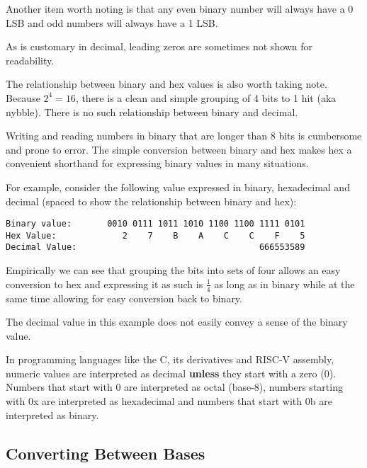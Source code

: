 Another item worth noting is that any even binary number will always
have a 0 LSB and odd numbers will always have a 1 LSB.

As is customary in decimal, leading zeros are sometimes not shown 
for readability.

The relationship between binary and hex values is also worth taking
note.  Because $2^4 = 16$, there is a clean and simple grouping
of 4 \gls{bit}s to 1 \gls{hit} (aka \gls{nybble}).  
There is no such relationship between binary and decimal.  

Writing and reading numbers in binary that are longer than 8 bits 
is cumbersome and prone to error.  The simple conversion between 
binary and hex makes hex a convenient shorthand for expressing 
binary values in many situations.  

For example, consider the following value expressed in binary, 
hexadecimal and decimal (spaced to show the relationship
between binary and hex):

\begin{verbatim}
Binary value:       0010 0111 1011 1010 1100 1100 1111 0101
Hex Value:             2    7    B    A    C    C    F    5
Decimal Value:                                    666553589
\end{verbatim}

Empirically we can see that grouping the bits into sets of four
allows an easy conversion to hex and expressing it as such is
$\frac{1}{4}$ as long as in binary while at the same time
allowing for easy conversion back to binary.

The decimal value in this example does not easily convey a sense
of the binary value.

\begin{tcolorbox}
In programming languages like the C, its derivatives and RISC-V 
assembly, numeric values are interpreted as decimal {\bfseries unless} 
they start with a zero (0).  
Numbers that start with 0 are interpreted as octal (base-8), 
numbers starting with 0x are interpreted as hexadecimal and 
numbers that start with 0b are interpreted as binary.
\end{tcolorbox}

\subsection{Converting Between Bases}

